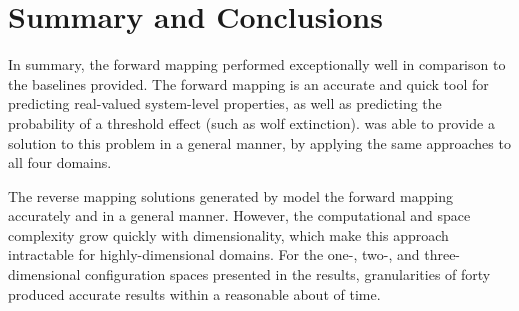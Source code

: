 \section{Summary and Conclusions}

In summary, the forward mapping performed exceptionally well in comparison to the baselines provided.
The forward mapping is an accurate and quick tool for predicting real-valued system-level properties, as well as predicting the probability of a threshold effect (such as wolf extinction).
\fw was able to provide a solution to this problem in a general manner, by applying the same approaches to all four domains.

The reverse mapping solutions generated by \fw model the forward mapping accurately and in a general manner.
However, the computational and space complexity grow quickly with dimensionality, which make this approach intractable for highly-dimensional domains.
For the one-, two-, and three-dimensional configuration spaces presented in the results, granularities of forty produced accurate results within a reasonable about of time.



